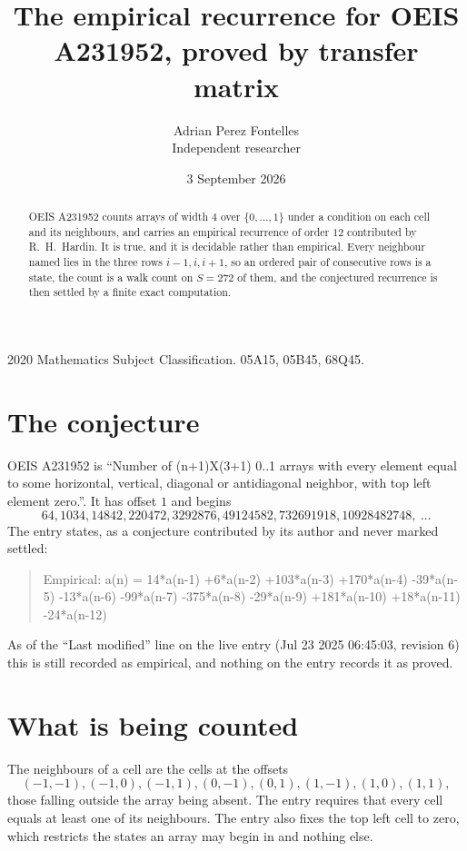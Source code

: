 \documentclass[11pt,a4paper]{article}
\title{The empirical recurrence for OEIS A231952, proved by transfer matrix}
\author{Adrian Perez Fontelles\\ \small Independent researcher}
\date{3 September 2026}
\theoremstyle{plain}
\theoremstyle{definition}
\begin{document}
\maketitle

\begin{abstract}
OEIS A231952 counts arrays of width $4$ over $\{0,\dots,1\}$ under a condition on each cell
and its neighbours, and carries an empirical recurrence of order $12$ contributed by
R.~H.~Hardin. It is true, and it is decidable rather than empirical. Every neighbour named lies
in the three rows $i-1,i,i+1$, so an ordered pair of consecutive rows is a state, the count is
a walk count on $S=272$ of them, and the conjectured recurrence is then settled by a finite
exact computation.
\end{abstract}

\noindent\small 2020 Mathematics Subject Classification. 05A15, 05B45, 68Q45.\normalsize

\section{The conjecture}

OEIS A231952 is ``Number of (n+1)X(3+1) 0..1 arrays with every element equal to some horizontal, vertical, diagonal or antidiagonal neighbor, with top left element zero.''. It has offset $1$ and begins
\[
64, 1034, 14842, 220472, 3292876, 49124582, 732691918, 10928482748,\ \dots
\]
The entry states, as a conjecture contributed by its author and never marked settled:
\begin{quote}
Empirical: a(n) = 14*a(n-1) +6*a(n-2) +103*a(n-3) +170*a(n-4) -39*a(n-5) -13*a(n-6) -99*a(n-7) -375*a(n-8) -29*a(n-9) +181*a(n-10) +18*a(n-11) -24*a(n-12)
\end{quote}
As of the ``Last modified'' line on the live entry (Jul 23 2025 06:45:03, revision 6) this is still
recorded as empirical, and nothing on the entry records it as proved.

\section{What is being counted}

The neighbours of a cell are the cells at the offsets
\[
(-1,-1), (-1,0), (-1,1), (0,-1), (0,1), (1,-1), (1,0), (1,1),
\]
those falling outside the array being absent. The entry requires that every cell equals at least one of its neighbours. The entry also fixes the top left cell to zero, which restricts the states an array may begin in and nothing else.
\end{document}
